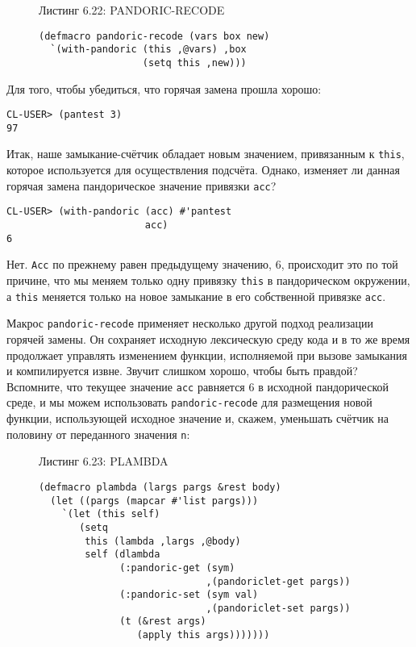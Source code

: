 \begin{figure}Листинг 6.22: PANDORIC-RECODE\label{listing_6.22}
\listbegin
\begin{verbatim}
(defmacro pandoric-recode (vars box new)
  `(with-pandoric (this ,@vars) ,box
                  (setq this ,new)))
\end{verbatim}
\listend
\end{figure}

Для того, чтобы убедиться, что горячая замена прошла хорошо:

\begin{verbatim}
CL-USER> (pantest 3)
97
\end{verbatim}

Итак, наше замыкание-счётчик обладает новым значением, привязанным к \verb"this", которое используется для осуществления подсчёта. Однако, изменяет ли данная горячая замена пандорическое значение привязки \verb"acc"?

\begin{verbatim}
CL-USER> (with-pandoric (acc) #'pantest
                        acc)
6
\end{verbatim}

Нет. \verb"Acc" по прежнему равен предыдущему значению, 6, происходит это по той причине, что мы меняем только одну привязку \verb"this" в пандорическом окружении, а \verb"this" меняется только на новое замыкание в его собственной привязке \verb"acc".

Макрос \verb"pandoric-recode" применяет несколько другой подход реализации горячей замены. Он сохраняет исходную лексическую среду кода и в то же время продолжает управлять изменением функции, исполняемой при вызове замыкания и компилируется извне. Звучит слишком хорошо, чтобы быть правдой? Вспомните, что текущее значение \verb"acc" равняется 6 в исходной пандорической среде, и мы можем использовать \verb"pandoric-recode" для размещения новой функции, использующей исходное значение и, скажем, уменьшать счётчик на половину от переданного значения \verb"n":

\begin{figure}Листинг 6.23: PLAMBDA\label{listing_6.23}
\listbegin
\begin{verbatim}
(defmacro plambda (largs pargs &rest body)
  (let ((pargs (mapcar #'list pargs)))
    `(let (this self)
       (setq
        this (lambda ,largs ,@body)
        self (dlambda
              (:pandoric-get (sym)
                             ,(pandoriclet-get pargs))
              (:pandoric-set (sym val)
                             ,(pandoriclet-set pargs))
              (t (&rest args)
                 (apply this args)))))))
\end{verbatim}
\listend
\end{figure}

